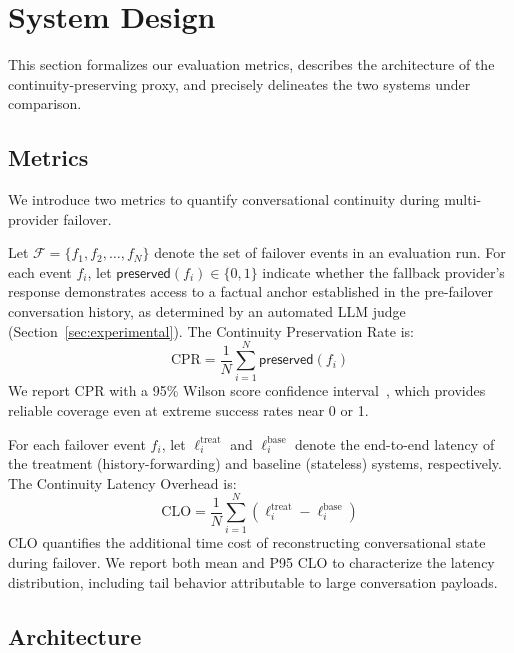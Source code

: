 \section{System Design}
\label{sec:method}

This section formalizes our evaluation metrics, describes the architecture of the continuity-preserving proxy, and precisely delineates the two systems under comparison.

\subsection{Metrics}

We introduce two metrics to quantify conversational continuity during multi-provider failover.

\begin{definition}
Let $\mathcal{F} = \{f_1, f_2, \ldots, f_N\}$ denote the set of failover events in an evaluation run. For each event $f_i$, let $\mathsf{preserved}(f_i) \in \{0, 1\}$ indicate whether the fallback provider's response demonstrates access to a factual anchor established in the pre-failover conversation history, as determined by an automated LLM judge (Section~\ref{sec:experimental}). The Continuity Preservation Rate is:
\[
    \mathrm{CPR} = \frac{1}{N} \sum_{i=1}^{N} \mathsf{preserved}(f_i)
\]
We report CPR with a 95\% Wilson score confidence interval~\cite{wilson1927}, which provides reliable coverage even at extreme success rates near 0 or 1.
\end{definition}

\begin{definition}
For each failover event $f_i$, let $\ell_i^{\mathrm{treat}}$ and $\ell_i^{\mathrm{base}}$ denote the end-to-end latency of the treatment (history-forwarding) and baseline (stateless) systems, respectively. The Continuity Latency Overhead is:
\[
    \mathrm{CLO} = \frac{1}{N} \sum_{i=1}^{N} \left(\ell_i^{\mathrm{treat}} - \ell_i^{\mathrm{base}}\right)
\]
CLO quantifies the additional time cost of reconstructing conversational state during failover. We report both mean and P95 CLO to characterize the latency distribution, including tail behavior attributable to large conversation payloads.
\end{definition}

\subsection{Architecture}

